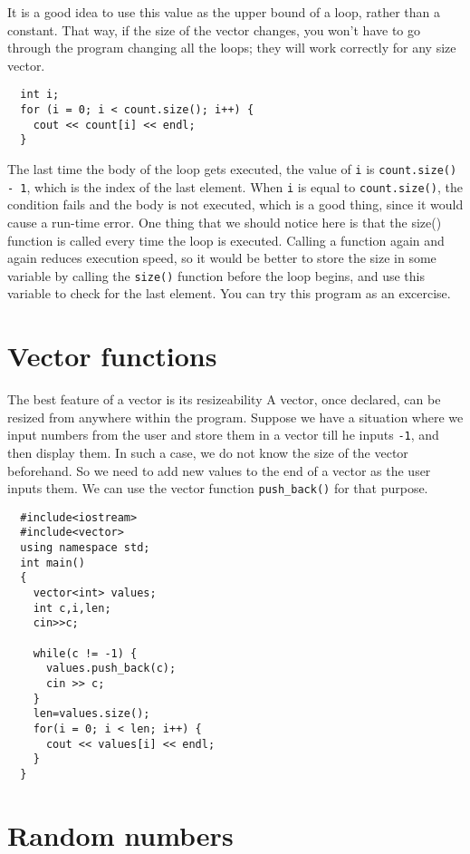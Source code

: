 It is a good idea to use this value as the upper bound of a loop,
rather than a constant.  That way, if the size of the vector
changes, you won't have to go through the program changing all the
loops; they will work correctly for any size vector.

\begin{verbatim}
  int i;
  for (i = 0; i < count.size(); i++) {
    cout << count[i] << endl;
  }
\end{verbatim}
%
The last time the body of the loop gets executed, the value of {\tt i}
is {\tt count.size() - 1}, which is the index of the last element.  When
{\tt i} is equal to {\tt count.size()}, the condition fails and the body
is not executed, which is a good thing, since it would cause a
run-time error. One thing that we should notice here is that the
size() function is called every time the loop is executed. Calling
a function again and again reduces execution speed, so it would be better
to store the size in some variable by calling the {\tt size()} function
before the loop begins, and use this variable to check for the last element.
You can try this program as an excercise.

\section{Vector functions}

The best feature of a vector is its resizeability A vector, once declared,
can be resized from anywhere within the program. Suppose we have a situation
where we input numbers from the user and store them in a vector till he
inputs {\tt -1}, and then display them. In such a case, we do not know the size of the
vector beforehand. So we need to add new values to the end of
a vector as the user inputs them. We can use the vector
function {\tt push\_back()} for that purpose.

\begin{verbatim}
  #include<iostream>
  #include<vector>
  using namespace std;
  int main()
  {
    vector<int> values;
    int c,i,len;
    cin>>c;
    
    while(c != -1) {
      values.push_back(c);
      cin >> c;
    }
    len=values.size();
    for(i = 0; i < len; i++) {
      cout << values[i] << endl;
    }
  }

\end{verbatim}

\section{Random numbers}
\label{random}
\label{pseudorandom}

